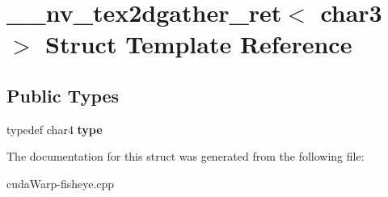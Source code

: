 \hypertarget{struct____nv__tex2dgather__ret_3_01char3_01_4}{}\section{\+\_\+\+\_\+nv\+\_\+tex2dgather\+\_\+ret$<$ char3 $>$ Struct Template Reference}
\label{struct____nv__tex2dgather__ret_3_01char3_01_4}
\subsection*{Public Types}
\begin{DoxyCompactItemize}
\item 
typedef char4 {\bfseries type}\hypertarget{struct____nv__tex2dgather__ret_3_01char3_01_4_a8e7d4d1b45af8c5e1db43c38a862cd96}{}\label{struct____nv__tex2dgather__ret_3_01char3_01_4_a8e7d4d1b45af8c5e1db43c38a862cd96}

\end{DoxyCompactItemize}


The documentation for this struct was generated from the following file\+:\begin{DoxyCompactItemize}
\item 
cuda\+Warp-\/fisheye.\+cpp\end{DoxyCompactItemize}
